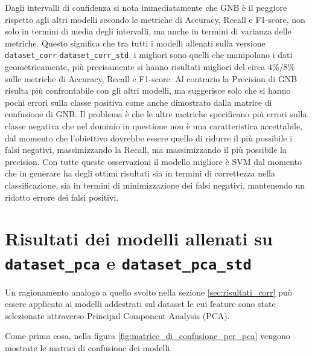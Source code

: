 Dagli intervalli di confidenza si nota immediatamente che GNB è il peggiore rispetto 
agli altri modelli secondo le metriche di Accuracy, Recall e F1-score, non solo
in termini di media degli intervalli, ma anche in termini di varianza delle metriche.
Questo significa che tra tutti i modelli allenati sulla versione \texttt{dataset\_corr}
\texttt{dataset\_corr\_std}, i migliori sono quelli che manipolano i dati geometricamente, 
più precisamente si hanno risultati migliori del circa $4\%/8\%$ sulle metriche di
Accuracy, Recall e F1-score. Al contrario la Precision di GNB risulta più confrontabile 
con gli altri modelli, ma suggerisce solo che si hanno pochi errori sulla classe 
positiva come anche dimostrato dalla matrice di confusione di GNB. Il problema è
che le altre metriche specificano più errori sulla classe negativa che nel dominio
in questione non è una caratteristica accettabile, dal momento che l'obiettivo 
dovrebbe essere quello di ridurre il più possibile i falsi negativi, massimizzando 
la Recall, ma massimizzando il più possibile la precision. Con tutte queste 
osservazioni il modello migliore è SVM dal momento che in generare ha degli ottimi
risultati sia in termini di correttezza nella classificazione, sia in termini
di minimizzazione dei falsi negativi, mantenendo un ridotto errore dei falsi positivi.


\section{Risultati dei modelli allenati su \texttt{dataset\_pca} e \texttt{dataset\_pca\_std}} \label{sec:risultati_pca}
Un ragionamento analogo a quello svolto nella sezione \ref{sec:risultati_corr} può essere
applicato ai modelli addestrati sul dataset le cui feature sono state selezionate
attraverso Principal Component Analysis (PCA).

Come prima cosa, nella figura \ref{fig:matrice_di_confusione_per_pca} vengono
mostrate le matrici di confusione dei modelli.

